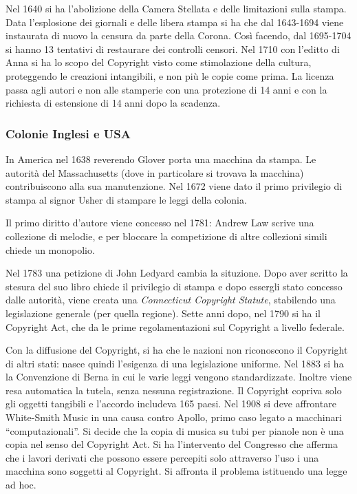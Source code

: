 Nel 1640 si ha l'abolizione della Camera Stellata e delle limitazioni sulla stampa. Data l'esplosione dei giornali e delle libera stampa si ha che dal 1643-1694 viene instaurata di nuovo la censura da parte della Corona. Cos\`i facendo, dal 1695-1704 si hanno 13 tentativi di restaurare dei controlli censori. Nel 1710 con l'editto di Anna si ha lo scopo del Copyright visto come stimolazione della cultura, proteggendo le creazioni intangibili, e non pi\`u le copie come prima.
La licenza passa agli autori e non alle stamperie con una protezione di 14 anni e con la richiesta di estensione di 14 anni dopo la scadenza.

\subsubsection{Colonie Inglesi e USA}

In America nel 1638 reverendo Glover porta una macchina da stampa. Le autorit\`a del Massachusetts (dove in particolare si trovava la macchina) contribuiscono alla sua manutenzione. Nel 1672 viene dato il primo privilegio di stampa al signor Usher di stampare le leggi della colonia.

Il primo diritto d'autore viene concesso nel 1781: Andrew Law scrive una collezione di melodie, e per bloccare la competizione di altre collezioni simili chiede un monopolio.

Nel 1783 una petizione di John Ledyard cambia la situzione. Dopo aver scritto la
stesura del suo libro chiede il privilegio di stampa e dopo essergli stato concesso dalle
autorit\`a, viene creata una \textit{Connecticut Copyright Statute}, stabilendo
una legislazione generale (per quella regione). Sette anni dopo, nel 1790 si ha
il Copyright Act, che da le prime regolamentazioni sul Copyright a livello federale.

Con la diffusione del Copyright, si ha che le nazioni non riconoscono il Copyright di altri stati: nasce quindi l'esigenza di una legislazione uniforme. Nel 1883 si ha la Convenzione di Berna in cui le varie leggi vengono standardizzate. Inoltre viene resa automatica la tutela, senza nessuna registrazione. Il Copyright copriva solo gli oggetti tangibili e l'accordo includeva 165 paesi. Nel 1908 si deve affrontare White-Smith Music in una causa contro Apollo, primo caso legato a macchinari ``computazionali''. Si decide che la copia di musica su tubi per pianole non \`e una copia nel senso del Copyright Act. Si ha l'intervento del Congresso che afferma che i lavori derivati che possono essere percepiti solo attraverso l'uso i una macchina sono soggetti al Copyright. Si affronta il problema istituendo una legge ad hoc.

